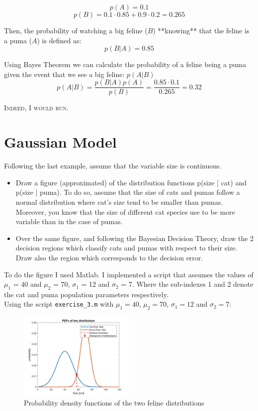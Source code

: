 \documentclass[]{article}
\begin{document}
$$p(A) = 0.1$$
$$p(B) = 0.1 \cdot 0.85 + 0.9 \cdot 0.2 = 0.265$$

Then, the probability of  watching a big feline ($B$) **knowing** that the feline is a puma ($A$) is defined as:\\

$$p(B|A) = 0.85$$

Using Bayes Theorem we can calculate the probability of a feline being a puma given the event that we see a big feline: $p(A|B)$\\

$$p(A|B) = \frac{p(B|A)p(A)}{p(B)} = \frac{0.85 \cdot 0.1}{0.265} = 0.32$$

\textsc{Indeed, I would run}.

\section{Gaussian Model}

Following the last example, assume that the variable size is continuous.
\begin{itemize}
\item Draw a figure (approximated) of the distribution functions p(size | cat) and p(size | puma). To do so, assume that the size of cats and pumas follow a normal distribution where cat’s size tend to be smaller than pumas. Moreover, you know that the size of different cat species use to be more variable than in the case of pumas.

\item Over the same figure, and following the Bayesian Decision Theory, draw the 2 decision regions which classify cats and pumas with respect to their size. Draw also the region which corresponds to the decision error.
\end{itemize}

To do the figure I used Matlab. I implemented a script that assumes the values of $\mu_1$ = 40 and $\mu_2$ = 70, $\sigma_1$ = 12 and $\sigma_2$ = 7. Where the sub-indexes 1 and 2 denote the cat and puma population parameters respectively. \\

Using the script \texttt{exercise\_3.m} with $\mu_1 = 40$, $\mu_2 =  70$, $\sigma_1 = 12$ and $\sigma_2 = 7$:

\begin{figure}[ht!]
\centering
	\includegraphics[width=0.5\textwidth]{../img/1d-gauss-model}
	\caption{Probability density functions of the two feline distributions}
\end{figure}
\end{document}
